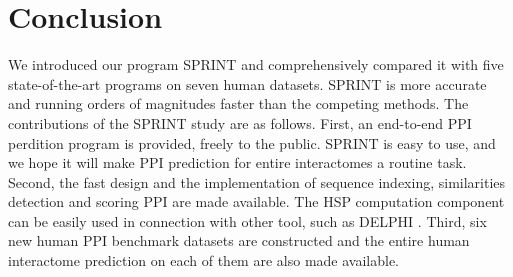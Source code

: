 \section{Conclusion}
We introduced our program SPRINT and comprehensively compared it with five state-of-the-art programs on seven human datasets. SPRINT is more accurate and running orders of magnitudes faster than the competing methods. The contributions of the SPRINT study are as follows.
First, an end-to-end PPI perdition program is provided, freely to the public. SPRINT is easy to use, and we hope it will make PPI prediction for entire interactomes a routine task. Second, the fast design and the implementation of sequence indexing, similarities detection and scoring PPI are made available. The HSP computation component can be easily used in connection with other tool, such as DELPHI \cite{li2020delphi, li2020delphi_ISMB}. Third, six new human PPI benchmark datasets are constructed and the entire human interactome prediction on each of them are also made available.